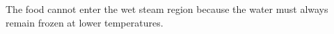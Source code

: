 The food cannot enter the wet steam region because the water must always remain frozen at lower temperatures.